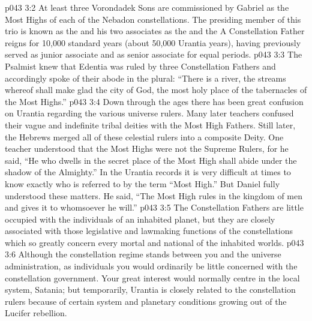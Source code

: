 \vs p043 3:2 \pc At least three Vorondadek Sons are commissioned by Gabriel as the Most Highs of each of the Nebadon constellations. The presiding member of this trio is known as the  and his two associates as the  and the  A Constellation Father reigns for 10,000 standard years (about 50,000 Urantia years), having previously served as junior associate and as senior associate for equal periods.
\vs p043 3:3 The Psalmist knew that Edentia was ruled by three Constellation Fathers and accordingly spoke of their abode in the plural: “There is a river, the streams whereof shall make glad the city of God, the most holy place of the tabernacles of the Most Highs.”
\vs p043 3:4 \pc Down through the ages there has been great confusion on Urantia regarding the various universe rulers. Many later teachers confused their vague and indefinite tribal deities with the Most High Fathers. Still later, the Hebrews merged all of these celestial rulers into a composite Deity. One teacher understood that the Most Highs were not the Supreme Rulers, for he said, “He who dwells in the secret place of the Most High shall abide under the shadow of the Almighty.” In the Urantia records it is very difficult at times to know exactly who is referred to by the term “Most High.” But Daniel fully understood these matters. He said, “The Most High rules in the kingdom of men and gives it to whomsoever he will.”
\vs p043 3:5 \pc The Constellation Fathers are little occupied with the individuals of an inhabited planet, but they are closely associated with those legislative and lawmaking functions of the constellations which so greatly concern every mortal  and national  of the inhabited worlds.
\vs p043 3:6 Although the constellation regime stands between you and the universe administration, as individuals you would ordinarily be little concerned with the constellation government. Your great interest would normally centre in the local system, Satania; but temporarily, Urantia is closely related to the constellation rulers because of certain system and planetary conditions growing out of the Lucifer rebellion.
